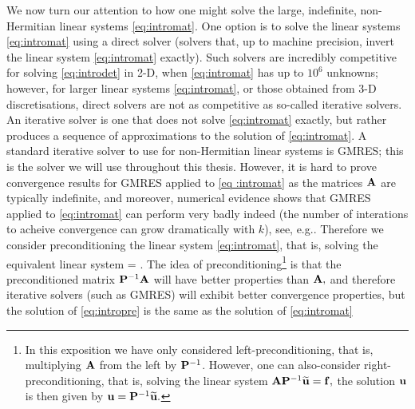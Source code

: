 We now turn our attention to how one might solve the large, indefinite, non-Hermitian linear systems \eqref{eq:intromat}. One option is to solve the linear systems \eqref{eq:intromat} using a direct solver (solvers that, up to machine precision, invert the linear system \eqref{eq:intromat} exactly). Such solvers are incredibly competitive for solving \eqref{eq:introdet} in 2-D, when \eqref{eq:intromat} has up to $10^6$ unknowns; however, for larger linear systems \eqref{eq:intromat}, or those obtained from 3-D discretisations, direct solvers  are not as competitive as so-called iterative solvers. An iterative solver is one that does not solve \eqref{eq:intromat} exactly, but rather produces a sequence of approximations to the solution of \eqref{eq:intromat}. A standard iterative solver to use for non-Hermitian linear systems is GMRES; this is the solver we will use throughout this thesis. However, it is hard to prove convergence results for GMRES applied to \eqref{eq	:intromat} as the matrices $\mathbf{A}$ are typically indefinite, and moreover, numerical evidence shows that GMRES applied to \eqref{eq:intromat} can perform very badly indeed (the number of interations to acheive convergence can grow dramatically with $k$), see, e.g.. Therefore we consider preconditioning the linear system \eqref{eq:intromat}, that is, solving the equivalent linear system
\beq\label{eq:intropre}
\PmatI\Amat \bu = \PmatI \bff.
\eeq
The idea of preconditioning\footnote{In this exposition we have only considered left-preconditioning, that is, multiplying $\mathbf{A}$ from the left by $\mathbf{P}^{-1}$. However, one can also-consider right-preconditioning, that is, solving the linear system $\mathbf{A} \mathbf{P}^{-1} \widetilde{\mathbf{u}} = \mathbf{f},$ the solution $\mathbf{u}$ is then given by $\mathbf{u} = \mathbf{P}^{-1} \widetilde{\mathbf{u}}.$} is that the preconditioned matrix $\mathbf{P}^{-1} \mathbf{A}$ will have better properties than $\mathbf{A},$ and therefore iterative solvers (such as GMRES) will exhibit better convergence properties, but the solution of \eqref{eq:intropre} is the same as the solution of \eqref{eq:intromat}

